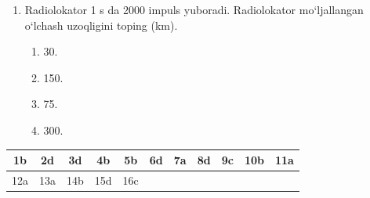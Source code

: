 \begin{enumerate}
\item Radiolokator 1 s da 2000 impuls yuboradi. Radiolokator mo‘ljallangan o‘lchash uzoqligini toping (km).
\begin{enumerate}[label=\Alph*)]
\item 30.
\item 150.
\item 75.
\item 300.
\end{enumerate}

\end{enumerate}




\begin{table}[!ht]
\centering
\begin{tabular}{|c|c|c|c|c|c|c|c|c|c|c|}
\hline
1b & 2d & 3d & 4b & 5b & 6d & 7a & 8d & 9c & 10b & 11a \\ \hline
12a & 13a & 14b & 15d & 16c & & & & & & \\ \hline
\end{tabular}
\end{table}